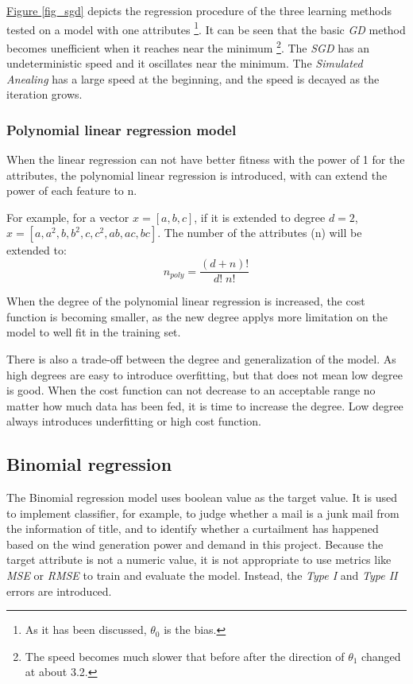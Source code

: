 \documentclass[12pt,a4paper]{report}
\begin{document}
        \hyperref[fig_sgd]{Figure \ref*{fig_sgd}} depicts the regression procedure of the three learning methods tested on a model with one attributes \footnote{As it has been discussed, $\theta_0$ is the bias.}. It can be seen that the basic \emph{GD} method becomes unefficient when it reaches near the minimum \footnote{The speed becomes much slower that before after the direction of $\theta_1$ changed at about 3.2.}. The \emph{SGD} has an undeterministic speed and it oscillates near the minimum. The \emph{Simulated Anealing} has a large speed at the beginning, and the speed is decayed as the iteration grows.

        \subsubsection{Polynomial linear regression model}
        When the linear regression can not have better fitness with the power of 1 for the attributes, the polynomial linear regression is introduced, with can extend the power of each feature to n.

        For example, for a vector $x = [a, b, c]$, if it is extended to degree $d = 2$, $x = [a, a^2, b, b^2, c, c^2, ab, ac, bc]$. The number of the attributes (n) will be extended to:
        \begin{equation}
            n_{poly}=\frac{(d+n)!}{d!\;n!}
        \end{equation}

        When the degree of the polynomial linear regression is increased, the cost function is becoming smaller, as the new degree applys more limitation on the model to well fit in the training set.

        There is also a trade-off between the degree and generalization of the model. As high degrees are easy to introduce overfitting, but that does not mean low degree is good. When the cost function can not decrease to an acceptable range no matter how much data has been fed, it is time to increase the degree. Low degree always introduces underfitting or high cost function.

        \subsection{Binomial regression}
        The Binomial regression model uses boolean value as the target value. It is used to implement classifier, for example, to judge whether a mail is a junk mail from the information of title, and to identify whether a curtailment has happened based on the wind generation power and demand in this project.
        Because the target attribute is not a numeric value, it is not appropriate to use metrics like \emph{MSE} or \emph{RMSE} to train and evaluate the model. Instead, the \emph{Type I} and \emph{Type II} errors are introduced.
\end{document}

